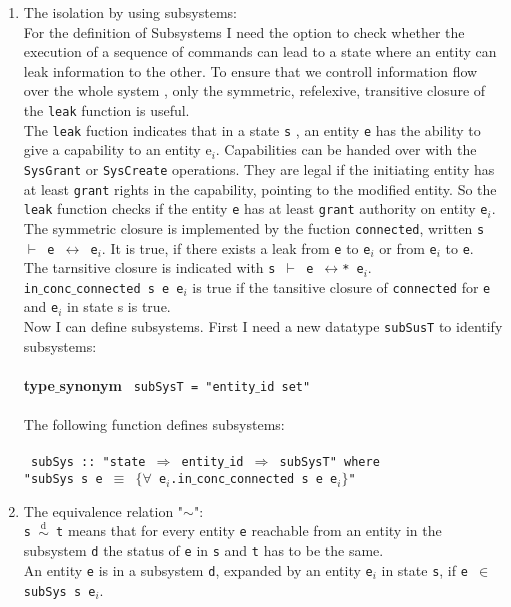 \begin{enumerate}
\item The isolation by using subsystems: \\
For the definition of Subsystems I need the option to check whether  the execution of a sequence of commands can lead to a state where an entity can leak information to the other. To ensure that we controll information flow over the whole system , only the symmetric, refelexive, transitive closure of the \texttt{leak} function is useful. \\
The  \texttt{leak} fuction \cite{TakeG} indicates that in a state \texttt{s} , an entity \texttt{e} has the ability to give a capability to an entity e$_i$. Capabilities can be handed over with the \texttt{SysGrant} or \texttt{SysCreate} operations. They are legal if the initiating entity has at least \texttt{grant} rights in the capability, pointing to the modified entity. So the \texttt{leak} function checks if the entity \texttt{e} has at least \texttt{grant} authority on entity \texttt{e$_i$}. The symmetric closure is implemented by the fuction \texttt{connected}, written \texttt{s $\vdash$ e $\longleftrightarrow$ e$_i$}. It is true, if there exists a leak from \texttt{e} to \texttt{e$_i$} or from \texttt{e$_i$} to \texttt{e}. \\
The tarnsitive closure is indicated with \texttt{s $\vdash$ e $\longleftrightarrow$* e$_i$}. \\
\texttt{in$\_$conc$\_$connected s e e$_i$} is true  if the tansitive closure of \texttt{connected} for \texttt{e} and \texttt{e$_i$} in state s is true. \\ 
Now I can define subsystems. First I need a new datatype \texttt{subSusT} to identify subsystems: \\ \\
{\textbf{type$\_$synonym}
\texttt{
subSysT = "entity$\_$id set"}} \\ \\
The following function defines subsystems: \\ \\
{
\texttt{
subSys :: "state $\Rightarrow$ entity$\_$id $\Rightarrow$ subSysT" where \\ 
"subSys s e $\equiv$ $\{\forall$ e$_i$.in$\_$conc$\_$connected s e e$_i\}$"}} 
\item The equivalence relation "$\sim$": \\
\texttt{s $\overset{\text{d}}{\sim}$ t} means that for every entity \texttt{e} reachable from an entity in the subsystem \texttt{d} the status of \texttt{e} in \texttt{s} and \texttt{t} has to be the same. \\
An entity \texttt{e} is in a subsystem \texttt{d}, expanded by an entity \texttt{e$_i$} in state \texttt{s}, if \texttt{e $\in$ subSys s e$_i$}.


\end{enumerate}
